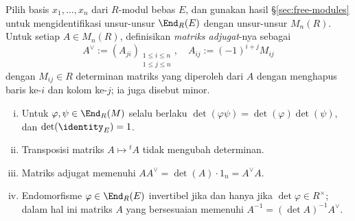 \begin{theorem}\label{prop:matrix-det}
	Pilih basis $x_1, \ldots, x_n$ dari $R$-modul bebas $E$, dan gunakan hasil \S\ref{sec:free-modules} untuk mengidentifikasi unsur-unsur $\End_R(E)$ dengan unsur-unsur $M_n(R)$. Untuk setiap $A \in M_n(R)$, definisikan \emph{matriks adjugat}-nya sebagai
	\[ A^\vee := (A_{ji})_{\substack{1 \leq i \leq n \\ 1 \leq j \leq n}}, \quad A_{ij} := (-1)^{i+j} M_{ij} \]
	dengan $M_{ij} \in R$ determinan matriks yang diperoleh dari $A$ dengan menghapus baris ke-$i$ dan kolom ke-$j$; ia juga disebut minor.
	\begin{enumerate}[(i)]
		\item Untuk $\varphi, \psi \in \End_R(M)$ selalu berlaku $\det(\varphi\psi) = \det(\varphi) \det(\psi)$, dan $\det(\identity_E) = 1$.
		\item Transposisi matriks $A \mapsto {}^t A$ tidak mengubah determinan.
		\item Matriks adjugat memenuhi $A A^\vee = \det(A) \cdot 1_n = A^\vee A$.
		\item Endomorfisme $\varphi \in \End_R(E)$ invertibel jika dan hanya jika $\det \varphi \in R^\times$; dalam hal ini matriks $A$ yang bersesuaian memenuhi $A^{-1} = (\det A)^{-1} A^\vee$.
	\end{enumerate}
\end{theorem}
